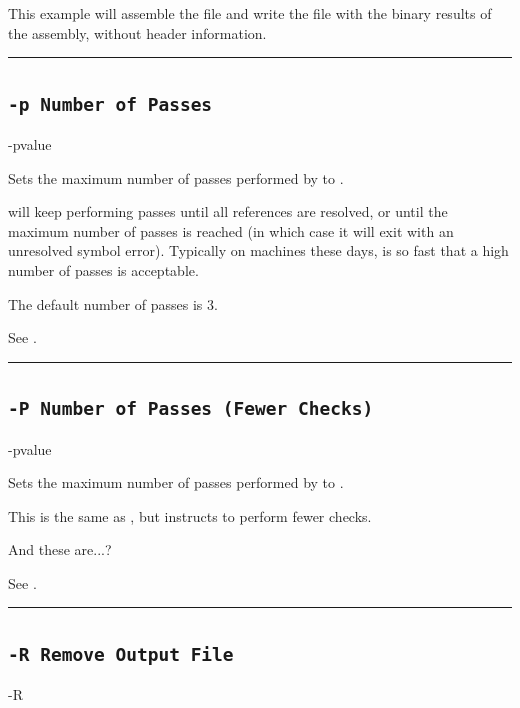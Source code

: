 This example will assemble the file  and write the file  with the binary results of the assembly, without header information.\\


\hrule
\subsection{\texttt{-p Number of Passes}}
\label{flag:passes}
\begin{usage}
-pvalue
\end{usage}

Sets the maximum number of passes performed by \dasm to .

\dasm will keep performing passes until all references are resolved, or until the maximum number of passes is reached (in which case it will exit with an unresolved symbol error). Typically on machines these days, \dasm is so fast that a high number of passes is acceptable.

\label{changelog:20200824passes}
The default number of passes is 3.

See .\\

\hrule
\subsection{\texttt{-P Number of Passes (Fewer Checks)}}
\label{flag:passes2}

\begin{usage}
-pvalue
\end{usage}

Sets the maximum number of passes performed by \dasm to .

This is the same as , but instructs \dasm to perform fewer checks.

\label{todo}
{\color{red}And these are...?}

See .\\

\hrule


\subsection{\texttt{-R Remove Output File}}
\label{flag:remove}
\begin{usage}
-R
\end{usage}

